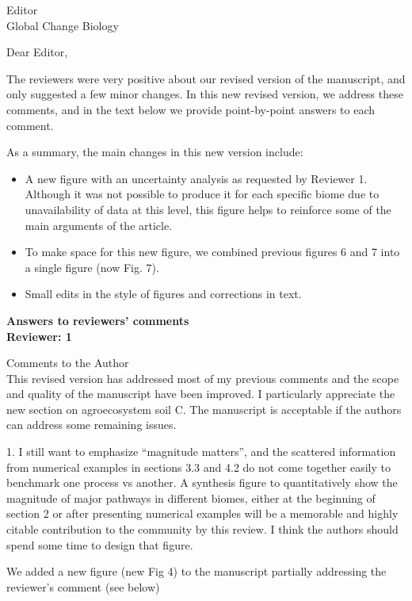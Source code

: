 \documentclass[11pt]{bgcletter}
\newcommand{\answer}[1] {
{\color{cyan} #1}
}
\begin{document}
\begin{letter}{Editor\\
   Global Change Biology
}
\opening{Dear Editor,}
The reviewers were very positive about our revised version of the manuscript, and only suggested a few minor changes. 
In this new revised version, we address these comments, and in the text below we provide point-by-point \answer{answers} to each comment. 

As a summary, the main changes in this new version include:
\begin{itemize}
\item A new figure with an uncertainty analysis as requested by Reviewer 1. Although it was not possible to produce it for each specific biome due to unavailability of data at this level, this figure helps to reinforce some of the main arguments of the article.
\item To make space for this new figure, we combined previous figures 6 and 7 into a single figure (now Fig. 7). 
\item Small edits in the style of figures and corrections in text.
\end{itemize}

\textbf{Answers to reviewers' comments} \\
\textbf{Reviewer: 1}

Comments to the Author \\
This revised version has addressed most of my previous comments and the scope and quality of the manuscript have been improved. I particularly appreciate the new section on agroecosystem soil C. The manuscript is acceptable if the authors can address some remaining issues.

1. I still want to emphasize ``magnitude matters'', and the scattered information from numerical examples in sections 3.3 and 4.2 do not come together easily to benchmark one process vs another. A synthesis figure to quantitatively show the magnitude of major pathways in different biomes, either at the beginning of section 2 or after presenting numerical examples will be a memorable and highly citable contribution to the community by this review. I think the authors should spend some time to design that figure.

\answer{We added a new figure (new Fig 4) to the manuscript partially addressing the reviewer's comment (see below)}  


\end{letter}
\end{document}
